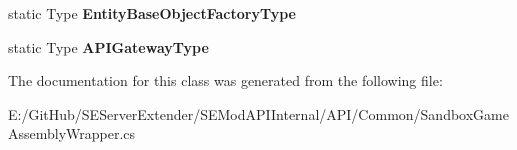 \begin{DoxyCompactItemize}
\item 
\hypertarget{class_s_e_mod_a_p_i_internal_1_1_a_p_i_1_1_common_1_1_sandbox_game_assembly_wrapper_ac123f3b68b579b84e176067ea3a6f2a5}{}static Type {\bfseries Entity\+Base\+Object\+Factory\+Type}\label{class_s_e_mod_a_p_i_internal_1_1_a_p_i_1_1_common_1_1_sandbox_game_assembly_wrapper_ac123f3b68b579b84e176067ea3a6f2a5}

\item 
\hypertarget{class_s_e_mod_a_p_i_internal_1_1_a_p_i_1_1_common_1_1_sandbox_game_assembly_wrapper_a9b770e171847568dcfbd5f7777694553}{}static Type {\bfseries A\+P\+I\+Gateway\+Type}\label{class_s_e_mod_a_p_i_internal_1_1_a_p_i_1_1_common_1_1_sandbox_game_assembly_wrapper_a9b770e171847568dcfbd5f7777694553}

\end{DoxyCompactItemize}


The documentation for this class was generated from the following file\+:\begin{DoxyCompactItemize}
\item 
E\+:/\+Git\+Hub/\+S\+E\+Server\+Extender/\+S\+E\+Mod\+A\+P\+I\+Internal/\+A\+P\+I/\+Common/Sandbox\+Game\+Assembly\+Wrapper.\+cs\end{DoxyCompactItemize}

